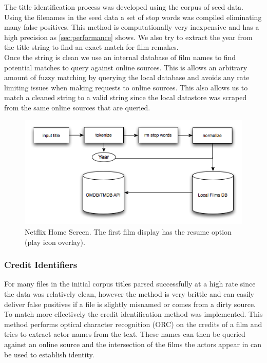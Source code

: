 \documentclass[paper=a4, fontsize=11pt]{scrartcl} %
\numberwithin{equation}{section} %
\numberwithin{figure}{section} %
\numberwithin{table}{section} %
\begin{document}
The title identification process was developed using the corpus of seed data. Using the filenames in the seed data a set of stop words was compiled eliminating many false positives. This method is computationally very inexpensive and has a high precision as \ref{sec:performance} shows. We also try to extract the year from the title string to find an exact match for film remakes. \\

Once the string is clean we use an internal database of film names to find potential matches to query against online sources. This is allows an arbitrary amount of fuzzy matching by querying the local database and avoids any rate limiting issues when making requests to online sources. This also allows us to match a cleaned string to a valid string since the local datastore was scraped from the same online sources that are queried. \\

\begin{figure}[H]
\center\includegraphics[scale=0.75]{title-identifier.png}
\caption{Netflix Home Screen. The first film display has the resume option (play icon overlay).}
\label{fig:title-identifier}
\end{figure}


\subsubsection{Credit Identifiers}
\label{sec:credit-identifier}

For many files in the initial corpus titles parsed successfully at a high rate since the data was relatively clean, however the method is very brittle and can easily deliver false positives if a file is slightly misnamed or comes from a dirty source. To match more effectively the credit identification method was implemented. This method performs optical character recognition (ORC) on the credits of a film and tries to extract actor names from the text. These names can then be queried against an online source and the intersection of the films the actors appear in can be used to establish identity. \\
\end{document}
